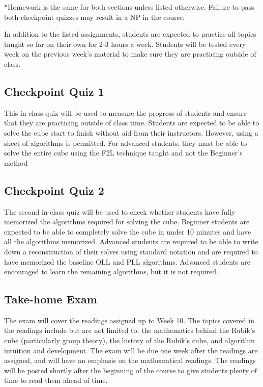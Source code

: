 \documentclass[11pt]{article}
\begin{document}
\begin{footnotesize}
*Homework is the same for both sections unless listed otherwise. Failure to pass both checkpoint quizzes may result in a NP in the course.

In addition to the listed assignments, students are expected to practice all topics taught so far on their own for 2-3 hours a week. Students will be tested every week on the previous week’s material to make sure they are practicing outside of class. 
\end{footnotesize}

\subsection*{Checkpoint Quiz 1}
This in-class quiz will be used to measure the progress of students and ensure that they are practicing outside of class time. Students are expected to be able to solve the cube start to finish without aid from their instructors. However, using a sheet of algorithms is permitted. For advanced students, they must be able to solve the entire cube using the F2L technique taught and not the Beginner’s method


\subsection*{Checkpoint Quiz 2}
The second in-class quiz will be used to check whether students have fully memorized the algorithms required for solving the cube. Beginner students are expected to be able to completely solve the cube in under 10 minutes and have all the algorithms memorized. Advanced students are required to be able to write down a reconstruction of their solves using standard notation and are required to have memorized the baseline OLL and PLL algorithms. Advanced students are encouraged to learn the remaining algorithms, but it is not required.


\subsection*{Take-home Exam}

The exam will cover the readings assigned up to Week 10. The topics covered in the readings include but are not limited to: the mathematics behind the Rubik’s cube (particularly group theory), the history of the Rubik’s cube, and algorithm intuition and development. The exam will be due one week after the readings are assigned, and will have an emphasis on the mathematical readings. The readings will be posted shortly after the beginning of the course to give students plenty of time to read them ahead of time.
\end{document}
